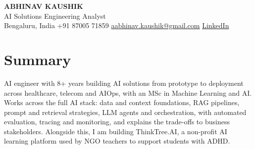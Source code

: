 \documentclass[10pt,a4paper]{article}
\begin{document}
\begin{center}
  {\LARGE\bfseries ABHINAV KAUSHIK}\\[2pt]
  {\large AI Solutions Engineering Analyst}\\[2pt]
  Bengaluru, India \textbar{} +91 87005 71859 \textbar{} \href{mailto:aabhinav.kaushik@gmail.com}{aabhinav.kaushik@gmail.com} \textbar{} \href{https://www.linkedin.com/in/abhinav-kaushik10/}{LinkedIn}  
\end{center}

\section{Summary}
AI engineer with 8+ years building AI solutions from prototype to deployment across healthcare, telecom and AIOps, with an MSc in Machine Learning and AI. Works across the full AI stack: data and context foundations, RAG pipelines, prompt and retrieval strategies, LLM agents and orchestration, with automated evaluation, tracing and monitoring, and explains the trade-offs to business stakeholders. Alongside this, I am building ThinkTree.AI, a non-profit AI learning platform used by NGO teachers to support students with ADHD.
\end{document}
